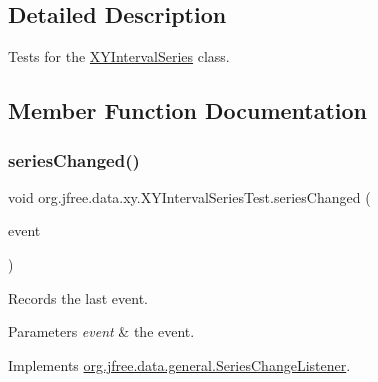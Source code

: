 \subsection{Detailed Description}
Tests for the \mbox{\hyperlink{classorg_1_1jfree_1_1data_1_1xy_1_1_x_y_interval_series}{X\+Y\+Interval\+Series}} class. 

\subsection{Member Function Documentation}
\mbox{\label{classorg_1_1jfree_1_1data_1_1xy_1_1_x_y_interval_series_test_a5d77fdc32fed928c33af80502526fb2d}} 
\subsubsection{\texorpdfstring{series\+Changed()}{seriesChanged()}}
{\footnotesize\ttfamily void org.\+jfree.\+data.\+xy.\+X\+Y\+Interval\+Series\+Test.\+series\+Changed (\begin{DoxyParamCaption}\item[{\mbox{\hyperlink{classorg_1_1jfree_1_1data_1_1general_1_1_series_change_event}{Series\+Change\+Event}}}]{event }\end{DoxyParamCaption})}

Records the last event.


\begin{DoxyParams}{Parameters}
{\em event} & the event. \\
\hline
\end{DoxyParams}


Implements \mbox{\hyperlink{interfaceorg_1_1jfree_1_1data_1_1general_1_1_series_change_listener_a441fd65d1290b91e0184124be928ebf7}{org.\+jfree.\+data.\+general.\+Series\+Change\+Listener}}.

\mbox{\label{classorg_1_1jfree_1_1data_1_1xy_1_1_x_y_interval_series_test_a212b99c12b5771e137337c75c17db3da}} 
